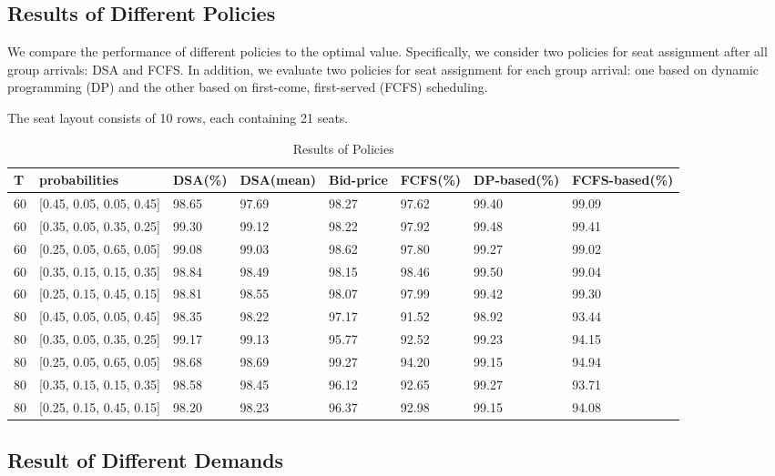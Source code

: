 \subsection{Results of Different Policies}

We compare the performance of different policies to the optimal value. Specifically, we consider two policies for seat assignment after all group arrivals: DSA and FCFS. In addition, we evaluate two policies for seat assignment for each group arrival: one based on dynamic programming (DP) and the other based on first-come, first-served (FCFS) scheduling. 

The seat layout consists of 10 rows, each containing 21 seats.

\begin{table}[ht]
  \centering
  \caption{Results of Policies}
  \begin{tabular}{|l|l|l|l|l|l|l|l|}
  \hline
   T & probabilities &  DSA(\%) & DSA(mean) & Bid-price & FCFS(\%) & DP-based(\%) & FCFS-based(\%) \\
  \hline
   60  & [0.45, 0.05, 0.05, 0.45]  & 98.65 & 97.69 & 98.27 & 97.62 & 99.40 & 99.09 \\
   60  & [0.35, 0.05, 0.35, 0.25]  & 99.30 & 99.12 & 98.22 & 97.92 & 99.48 & 99.41 \\
   60  & [0.25, 0.05, 0.65, 0.05]  & 99.08 & 99.03 & 98.62 & 97.80 & 99.27 & 99.02 \\ 
   60  & [0.35, 0.15, 0.15, 0.35]  & 98.84 & 98.49 & 98.15 & 98.46 & 99.50 & 99.04 \\
   60  & [0.25, 0.15, 0.45, 0.15]  & 98.81 & 98.55 & 98.07 & 97.99 & 99.42 & 99.30 \\
   80  & [0.45, 0.05, 0.05, 0.45]  & 98.35 & 98.22 & 97.17 & 91.52 & 98.92 & 93.44 \\
   80  & [0.35, 0.05, 0.35, 0.25]  & 99.17 & 99.13 & 95.77 & 92.52 & 99.23 & 94.15 \\
   80  & [0.25, 0.05, 0.65, 0.05]  & 98.68 & 98.69 & 99.27 & 94.20 & 99.15 & 94.94 \\ 
   80  & [0.35, 0.15, 0.15, 0.35]  & 98.58 & 98.45 & 96.12 & 92.65 & 99.27 & 93.71 \\
   80  & [0.25, 0.15, 0.45, 0.15]  & 98.20 & 98.23 & 96.37 & 92.98 & 99.15 & 94.08 \\
  \hline
  \end{tabular}
\end{table}


\subsection{Result of Different Demands}

